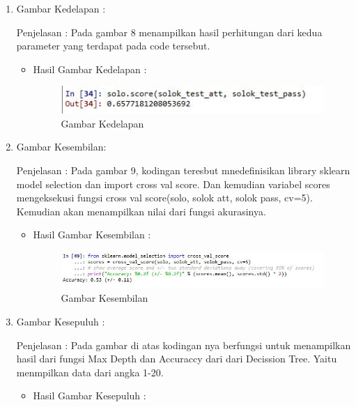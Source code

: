 \begin{enumerate}
\begin{itemize}
\begin{enumerate}
\begin{itemize}
\end{itemize}
\item  Gambar Kedelapan :
\par Penjelasan : Pada gambar 8 menampilkan hasil perhitungan dari kedua parameter yang terdapat pada code tersebut.
\par 
\begin{itemize}
\par
\item Hasil  Gambar Kedelapan :

\begin{figure}[ht]
\centering
\includegraphics[scale=0.8]{figures/8.jpg}
\caption{ Gambar Kedelapan}
\label{8}
\end{figure}


\end{itemize}
\item  Gambar Kesembilan:
\par Penjelasan : Pada gambar 9, kodingan teresbut mnedefinisikan library sklearn model selection dan import cross val score. Dan kemudian variabel scores mengeksekusi fungsi cross val score(solo, solok att, solok pass, cv=5). Kemudian akan menampilkan nilai dari fungsi akurasinya.
\par 
\begin{itemize}
\par
\item Hasil  Gambar Kesembilan :

\begin{figure}[ht]
\centering
\includegraphics[scale=0.4]{figures/9.jpg}
\caption{ Gambar Kesembilan}
\label{9}
\end{figure}


\end{itemize}
\item  Gambar Kesepuluh :
\par Penjelasan : Pada gambar di atas kodingan nya berfungsi untuk menampilkan hasil dari fungsi Max Depth dan Accuraccy dari dari Decission Tree. Yaitu menmpilkan data dari angka 1-20. 
\par 
\begin{itemize}
\par
\item Hasil  Gambar Kesepuluh :


\end{itemize}
\end{enumerate}
\end{itemize}
\end{enumerate}
